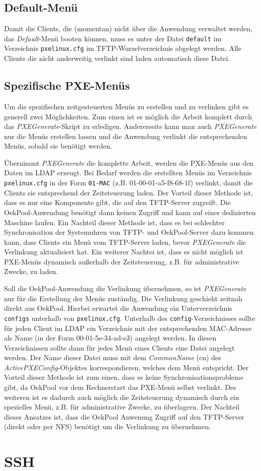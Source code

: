\documentclass[	
				a4paper, 
				twoside,
				11pt,
				DIV11,
				BCOR12mm,
				bibtotoc, 
				halfparskip, 
				headsepline, 
				pointlessnumbers]{scrartcl}
\begin{document}
\subsection{Default-Menü}
Damit die Clients, die (momentan) nicht über die Anwendung verwaltet werden, das \textit{Default}-Menü booten können, muss es unter der Datei \verb+default+ im Verzeichnis \verb+pxelinux.cfg+ im TFTP-Wurzelverzeichnis abgelegt werden.
Alle Clients die nicht anderweitig verlinkt sind laden automatisch diese Datei.
\subsection{Spezifische PXE-Menüs}
Um die spezifischen zeitgesteuerten Menüs zu erstellen und zu verlinken gibt es generell zwei Möglichkeiten.
Zum einen ist es möglich die Arbeit komplett durch das \textit{PXEGenerate}-Skript zu erledigen.
Andererseits kann man auch \textit{PXEGenerate} nur die Menüs erstellen lassen und die Anwendung verlinkt die entsprechenden Menüs, sobald sie benötigt werden.

Übernimmt \textit{PXEGenerate} die komplette Arbeit, werden die PXE-Menüs aus den Daten im LDAP erzeugt.
Bei Bedarf werden die erstellten Menüs im Verzeichnis \verb+pxelinux.cfg+ in der Form \verb+01-MAC+ (z.B. 01-00-01-a5-f8-68-1f) verlinkt, damit die Clients sie entsprechend der Zeitsteuerung laden.
Der Vorteil dieser Methode ist, dass es nur eine Komponente gibt, die auf den TFTP-Server zugreift. Die OekPool-Anwendung benötigt dann keinen Zugriff und kann auf einer dedizierten Maschine laufen.
Ein Nachteil dieser Methode ist, dass es bei schlechter Synchronisation der Systemuhren von TFTP- und OekPool-Server dazu kommen kann, dass Clients ein Menü vom TFTP-Server laden, bevor \textit{PXEGenerate} die Verlinkung aktualisiert hat.
Ein weiterer Nachtei ist, dass es nicht möglich ist PXE-Menüs dynamisch außerhalb der Zeitsteuerung, z.B. für administrative Zwecke, zu laden.

Soll die OekPool-Anwendung die Verlinkung übernehmen, so ist \textit{PXEGenerate} nur für die Erstellung der Menüs zuständig.
Die Verlinkung geschieht zeitnah direkt aus OekPool. Hierbei erwartet die Anwendung ein Unterverzeichnis \verb+configs+ unterhalb von \verb+pxelinux.cfg+.
Unterhalb des \verb+config+-Verzeichnisses sollte für jeden Client im LDAP ein Verzeichnis mit der entsprechenden MAC-Adresse als Name (in der Form 00-01-5e-34-ad-e3) angelegt werden.
In diesen Verzeichnissen sollte dann für jedes Menü eines Clients eine Datei angelegt werden. Der Name dieser Datei muss mit dem \textit{CommonName} (cn) des \textit{ActivePXEConfig}-Objektes korrespondieren, welches dem Menü entspricht.
Der Vorteil dieser Methode ist zum einen, dass es keine Synchronisationsprobleme gibt, da OekPool vor dem Rechnerstart das PXE-Menü selbst verlinkt.
Des weiteren ist es dadurch auch möglich die Zeitsteuerung dynamisch durch ein spezielles Menü, z.B. für administrative Zwecke, zu überlagern.
Der Nachteil dieses Ansatzes ist, dass die OekPool Anwenung Zugriff auf den TFTP-Server (direkt oder per NFS) benötigt um die Verlinkung zu übernehmen.
\section{SSH}
\end{document}

